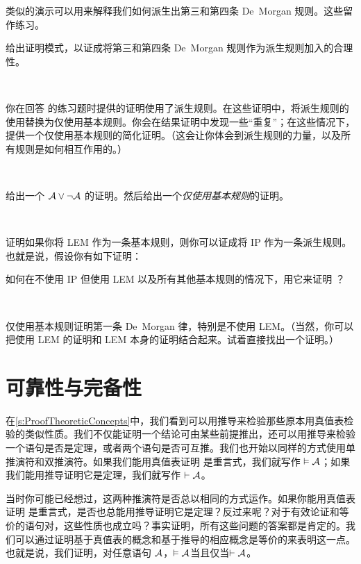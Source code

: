 类似的演示可以用来解释我们如何派生出第三和第四条 De~Morgan 规则。这些留作练习。

\practiceproblems

\problempart
给出证明模式，以证成将第三和第四条 De~Morgan 规则作为派生规则加入的合理性。

\

\problempart
你在回答 的练习题时提供的证明使用了派生规则。在这些证明中，将派生规则的使用替换为仅使用基本规则。你会在结果证明中发现一些“重复”；在这些情况下，提供一个仅使用基本规则的简化证明。（这会让你体会到派生规则的力量，以及所有规则是如何相互作用的。）

\

\problempart
给出一个 $\mathcal{A} \vee \neg\mathcal{A}$ 的证明。然后给出一个\emph{仅使用基本规则}的证明。

\

\problempart
证明如果你将 LEM 作为一条基本规则，则你可以证成将 IP 作为一条派生规则。也就是说，假设你有如下证明：

\begin{fitchproof}
  \open
  \AS
  \close
\end{fitchproof}


如何在不使用 IP 但使用 LEM 以及所有其他基本规则的情况下，用它来证明 ？

\

\problempart
仅使用基本规则证明第一条 De~Morgan 律，特别是不使用 LEM。（当然，你可以把使用 LEM 的证明和 LEM 本身的证明结合起来。试着直接找出一个证明。）

\chapter{可靠性与完备性}
\label{sec:soundness_and_completeness}

在\cref{s:ProofTheoreticConcepts}中，我们看到可以用推导来检验那些原本用真值表检验的类似性质。我们不仅能证明一个结论可由某些前提推出，还可以用推导来检验一个语句是否是定理，或者两个语句是否可互推。我们也开始以同样的方式使用单推演符和双推演符。如果我们能用真值表证明  是重言式，我们就写作 $\vDash \mathcal{A}$；如果我们能用推导证明它是定理，我们就写作 $\vdash \mathcal{A}$。

当时你可能已经想过，这两种推演符是否总以相同的方式运作。如果你能用真值表证明  是重言式，是否也总能用推导证明它是定理？反过来呢？对于有效论证和等价的语句对，这些性质也成立吗？事实证明，所有这些问题的答案都是肯定的。我们可以通过证明基于真值表的概念和基于推导的相应概念是等价的来表明这一点。也就是说，我们证明，对任意语句 $\mathcal{A}$，$\vDash \mathcal{A}$当且仅当$\vdash \mathcal{A}$。

